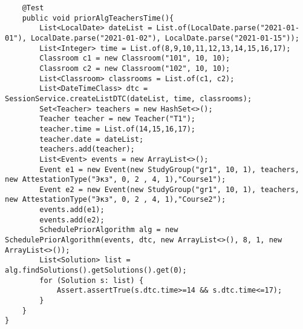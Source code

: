 \begin{lstlisting}
	@Test
	public void priorAlgTeachersTime(){
		List<LocalDate> dateList = List.of(LocalDate.parse("2021-01-01"), LocalDate.parse("2021-01-02"), LocalDate.parse("2021-01-15"));
		List<Integer> time = List.of(8,9,10,11,12,13,14,15,16,17);
		Classroom c1 = new Classroom("101", 10, 10);
		Classroom c2 = new Classroom("102", 10, 10);
		List<Classroom> classrooms = List.of(c1, c2);
		List<DateTimeClass> dtc = SessionService.createListDTC(dateList, time, classrooms);
		Set<Teacher> teachers = new HashSet<>();
		Teacher teacher = new Teacher("T1");
		teacher.time = List.of(14,15,16,17);
		teacher.date = dateList;
		teachers.add(teacher);
		List<Event> events = new ArrayList<>();
		Event e1 = new Event(new StudyGroup("gr1", 10, 1), teachers, new AttestationType("Экз", 0, 2 , 4, 1),"Course1");
		Event e2 = new Event(new StudyGroup("gr1", 10, 1), teachers, new AttestationType("Экз", 0, 2 , 4, 1),"Course2");
		events.add(e1);
		events.add(e2);
		SchedulePriorAlgorithm alg = new SchedulePriorAlgorithm(events, dtc, new ArrayList<>(), 8, 1, new ArrayList<>());
		List<Solution> list = alg.findSolutions().getSolutions().get(0);
		for (Solution s: list) {
			Assert.assertTrue(s.dtc.time>=14 && s.dtc.time<=17);
		}
	}
}	
\end{lstlisting}	